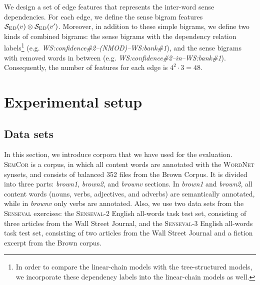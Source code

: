 \documentclass[english]{jnlp_1.4}
\begin{document}
We design a set of edge features that represents the inter-word sense dependencies.
For each edge, we define the sense bigram features ${\cal S}_{\mathrm{ED}}(v) \otimes {\cal S}_{\mathrm{ED}}(v')$.
Moreover, in addition to these simple bigrams, we define two kinds of combined bigrams: the sense bigrams with the dependency relation labels\footnote{In order to compare the linear-chain models with the tree-structured models, we incorporate these dependency labels into the linear-chain models as well.} (e.g. \textit{WS:confidence\#2--(NMOD)--WS:bank\#1}), and the sense bigrams with removed words in between (e.g. \textit{WS:confidence\#2--in--WS:bank\#1}).
Consequently, the number of features for each edge is $4^2 \cdot 3=48$.


\section{Experimental setup}
\label{section:setup}

\subsection{Data sets}
\label{section:data-sets}

In this section, we introduce corpora that we have used for the evaluation.
\textsc{SemCor} \cite{miller:1993} is a corpus, in which all content words are annotated with the \textsc{WordNet} synsets, and consists of balanced 352 files from the Brown Corpus.
It is divided into three parts: \textit{brown1}, \textit{brown2}, and \textit{brownv} sections.
In \textit{brown1} and \textit{brown2}, all content words (nouns, verbs, adjectives, and adverbs) are semantically annotated, while in \textit{brownv} only verbs are annotated.
Also, we use two data sets from the \textsc{Senseval} exercises: the \textsc{Senseval}-2 English all-words task \cite{palmer:2001} test set, consisting of three articles from the Wall Street Journal, and the \textsc{Senseval}-3 English all-words task \cite{snyder:2004} test set, consisting of two articles from the Wall Street Journal and a fiction excerpt from the Brown corpus.
\end{document}
